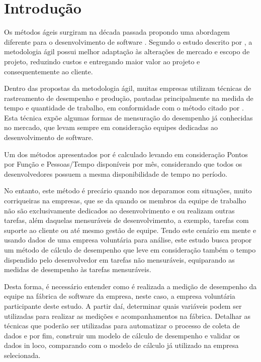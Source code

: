 \section{Introdução}
Os métodos ágeis surgiram na década passada propondo uma abordagem diferente para o desenvolvimento de software \cite{sato2007usoMetricas}. Segundo o estudo descrito por  \citeauthor{sato2007usoMetricas}, a metodologia ágil possui melhor adaptação às alterações de mercado e escopo de projeto, reduzindo custos e entregando maior valor ao projeto e consequentemente ao cliente.\par

Dentro das propostas da metodologia ágil, muitas empresas utilizam técnicas de rastreamento de desempenho e produção, pautadas principalmente na medida de tempo e quantidade de trabalho, em conformidade com o método citado por . Esta técnica expõe algumas formas de mensuração do desempenho já conhecidas no mercado, que levam sempre em consideração equipes dedicadas ao desenvolvimento de software.\par 

Um dos métodos apresentados por  é calculado levando em consideração Pontos por Função e Pessoas/Tempo disponíveis por mês, considerando que todos os desenvolvedores possuem a mesma disponibilidade de tempo no período.

No entanto, este método é precário quando nos deparamos com situações, muito corriqueiras na empresas, que se da quando os membros da equipe de trabalho não são exclusivamente dedicados ao desenvolvimento e ou realizam outras tarefas, além daquelas mensuráveis de desenvolvimento, a exemplo, tarefas com suporte ao cliente ou até mesmo gestão de equipe. Tendo este cenário em mente e usando dados de uma empresa voluntária para análise, este estudo busca propor um método de cálculo de desempenho que leve em consideração também o tempo dispendido pelo desenvolvedor em tarefas não mensuráveis, equiparando as medidas de desempenho às tarefas mensuráveis.\par

Desta forma, é necessário entender como é realizada a medição de desempenho da equipe na fábrica de software da empresa, neste caso, a empresa voluntária participante deste estudo. A partir daí, determinar quais variáveis podem ser utilizadas para realizar as medições e acompanhamentos na fábrica. Detalhar as técnicas que poderão ser utilizadas para automatizar o processo de coleta de dados e por fim, construir um modelo de cálculo de desempenho e validar os dados in loco, comparando com o modelo de cálculo já utilizado na empresa selecionada.